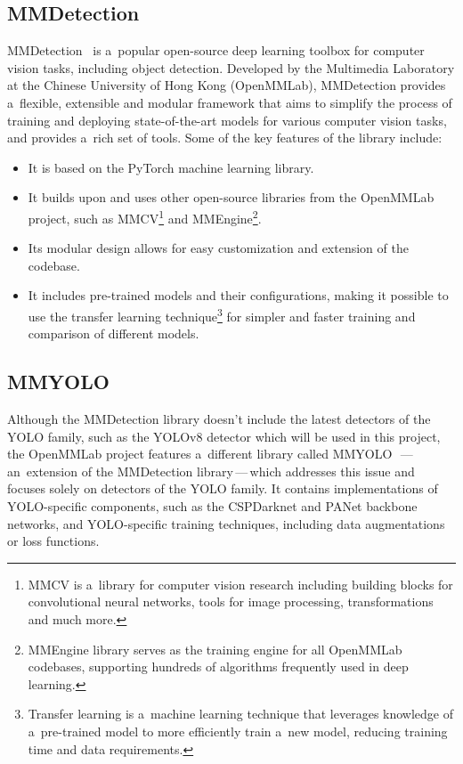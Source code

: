 \subsection{MMDetection}

MMDetection~\cite{MMDetection} is a~popular open-source deep learning toolbox
for computer vision tasks, including object detection. Developed by the
Multimedia Laboratory at the Chinese University of Hong Kong (OpenMMLab),
MMDetection provides a~flexible, extensible and modular framework that aims to
simplify the process of training and deploying state-of-the-art models for
various computer vision tasks, and provides a~rich set of tools. Some of the key
features of the library include:

\begin{itemize}
    \item It is based on the PyTorch machine learning library.
    \item It builds upon and uses other open-source libraries from the OpenMMLab
    project, such as MMCV\footnote{MMCV is a~library for computer vision
    research including building blocks for convolutional neural networks, tools
    for image processing, transformations and much more.} and
    MMEngine\footnote{MMEngine library serves as the training engine for all
    OpenMMLab codebases, supporting hundreds of algorithms frequently used in
    deep learning.}.
    \item Its modular design allows for easy customization and extension
    of the codebase.
    \item It includes pre-trained models and their configurations, making it
    possible to use the transfer learning technique\footnote{Transfer learning
    is a~machine learning technique that leverages knowledge of a~pre-trained
    model to more efficiently train a~new model, reducing training time and data
    requirements.} for simpler and faster training and comparison of different
    models.
\end{itemize}


\subsection{MMYOLO}

Although the MMDetection library doesn't include the latest detectors of the
YOLO family, such as the YOLOv8 detector which will be used in this project, the
OpenMMLab project features a~different library called
MMYOLO~\cite{MMYOLO}\,---\,an~extension of the MMDetection library\,---\,which
addresses this issue and focuses solely on detectors of the YOLO family. It
contains implementations of YOLO-specific components, such as the CSPDarknet and
PANet backbone networks, and YOLO-specific training techniques, including data
augmentations or loss functions.


